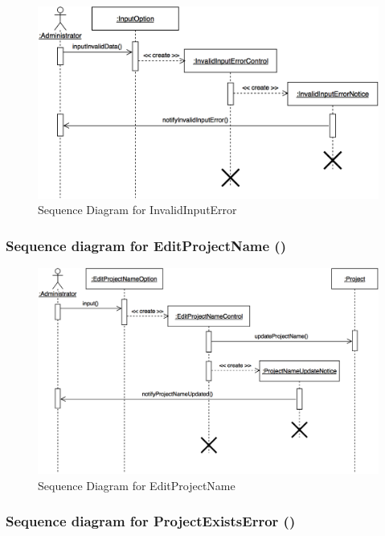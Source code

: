 \documentclass[12pt,letterpaper]{article}
\begin{document}
\begin{figure}[H]
	\centering{}
	\includegraphics[scale=0.3]{imgs/seq/invalid-input-error.png}
	\caption{Sequence Diagram for InvalidInputError}
\end{figure}

\subsubsection*{Sequence diagram for EditProjectName (\editprojectname{})}

\begin{figure}[H]
	\centering{}
	\includegraphics[scale=0.3]{imgs/seq/edit-project-name.png}
	\caption{Sequence Diagram for EditProjectName}
\end{figure}

\subsubsection*{Sequence diagram for ProjectExistsError (\projectexistserror{})}
\end{document}
